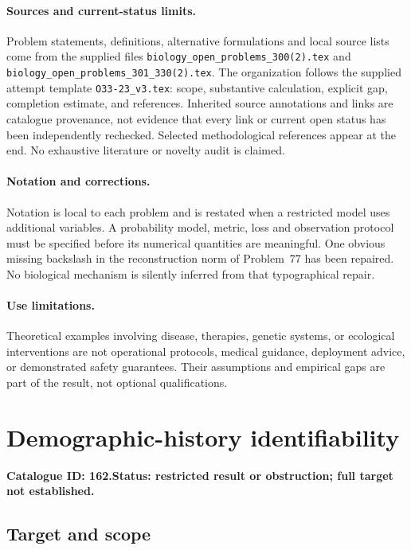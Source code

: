 \documentclass[11pt]{article}
\begin{document}
\paragraph{Sources and current-status limits.}
Problem statements, definitions, alternative formulations and local source lists
come from the supplied files
\texttt{biology\_open\_problems\_300(2).tex} and
\texttt{biology\_open\_problems\_301\_330(2).tex}.
The organization follows the supplied attempt template
\texttt{O33-23\_v3.tex}: scope, substantive calculation, explicit gap,
completion estimate, and references. Inherited source annotations and links are
catalogue provenance, not evidence that every link or current open status has
been independently rechecked. Selected methodological references appear at the
end. No exhaustive literature or novelty audit is claimed.

\paragraph{Notation and corrections.}
Notation is local to each problem and is restated when a restricted model uses
additional variables. A probability model, metric, loss and observation protocol
must be specified before its numerical quantities are meaningful. One obvious
missing backslash in the reconstruction norm of Problem~77 has been repaired.
No biological mechanism is silently inferred from that typographical repair.

\paragraph{Use limitations.}
Theoretical examples involving disease, therapies, genetic systems, or ecological
interventions are not operational protocols, medical guidance, deployment advice,
or demonstrated safety guarantees. Their assumptions and empirical gaps are part
of the result, not optional qualifications.

\setcounter{section}{161}
\section{Demographic-history identifiability}
\label{prob:162}
\noindent\textbf{Catalogue ID: 162.}\quad \textbf{Status: restricted result or obstruction; full target not established.}
\subsection{Target and scope}
\end{document}
